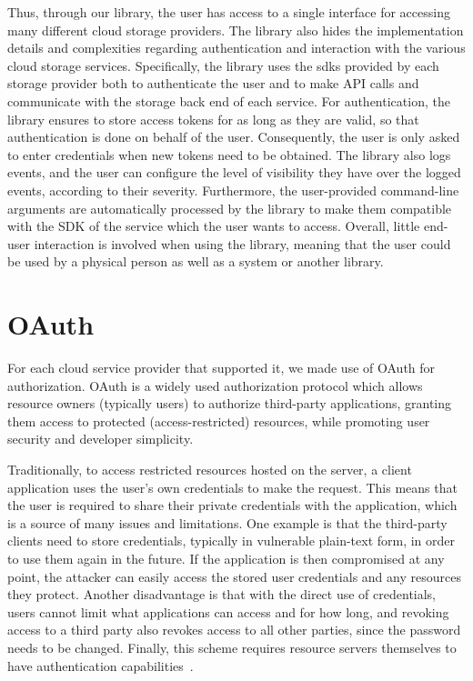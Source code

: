Thus, through our library, the user has access to a single interface for accessing many different cloud storage providers. The library also hides the implementation details and complexities regarding authentication and interaction with the various cloud storage services. Specifically, the library uses the \acp{sdk} provided by each storage provider both to authenticate the user and to make API calls and communicate with the storage back end of each service. For authentication, the library ensures to store access tokens for as long as they are valid, so that authentication is done on behalf of the user. Consequently, the user is only asked to enter credentials when new tokens need to be obtained. The library also logs events, and the user can configure the level of visibility they have over the logged events, according to their severity. Furthermore, the user-provided command-line arguments are automatically processed by the library to make them compatible with the SDK of the service which the user wants to access. Overall, little end-user interaction is involved when using the library, meaning that the user could be used by a physical person as well as a system or another library.


\section{OAuth}
For each cloud service provider that supported it, we made use of OAuth for authorization. OAuth is a widely used authorization protocol which allows resource owners (typically users) to authorize third-party applications, granting them access to protected (access-restricted) resources, while promoting user security and developer simplicity.  

Traditionally, to access restricted resources hosted on the server, a client application uses the user's own credentials  to make the request. This means that the user is required to share their private credentials with the application, which is a source of many issues and limitations. One example is that the third-party clients need to store credentials, typically in vulnerable plain-text form,  in order to use them again in the future. If the application is then compromised at any point, the attacker can easily access the stored user credentials and any resources they protect. Another disadvantage is that with the direct use of credentials, users cannot limit what applications can access and for how long, and revoking access to a third party also revokes access to all other parties, since the password needs to be changed. Finally, this scheme requires resource servers themselves to have authentication capabilities~\cite{oauth}.

